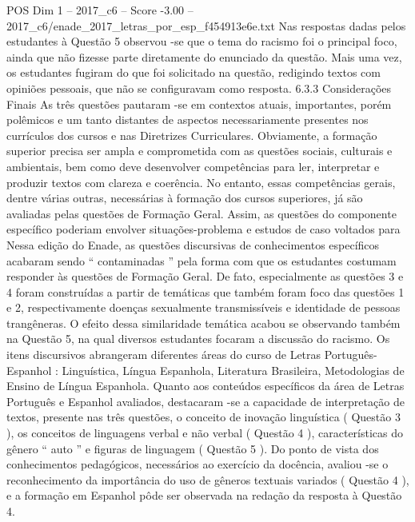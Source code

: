 \begin{textsample}{POS Dim 1 – 2017\_c6 – Score -3.00 – 2017\_c6/enade\_2017\_letras\_por\_esp\_f454913e6e.txt}
Nas respostas dadas pelos estudantes à Questão 5 observou -se que o tema do racismo foi o principal foco, ainda que não fizesse parte diretamente do enunciado da questão.
Mais uma vez, os estudantes fugiram do que foi solicitado na questão, redigindo textos com opiniões pessoais, que não se configuravam como resposta. 6.3.3 Considerações Finais As três questões pautaram -se em contextos atuais, importantes, porém polêmicos e um tanto distantes de aspectos necessariamente presentes nos currículos dos cursos e nas Diretrizes Curriculares.
Obviamente, a formação superior precisa ser ampla e comprometida com as questões sociais, culturais e ambientais, bem como deve desenvolver competências para ler, interpretar e produzir textos com clareza e coerência.
No entanto, essas competências gerais, dentre várias outras, necessárias à formação dos cursos superiores, já são avaliadas pelas questões de Formação Geral.
Assim, as questões do componente específico poderiam envolver situações-problema e estudos de caso voltados para Nessa edição do Enade, as questões discursivas de conhecimentos específicos acabaram sendo “ contaminadas ” pela forma com que os estudantes costumam responder às questões de Formação Geral.
De fato, especialmente as questões 3 e 4 foram construídas a partir de temáticas que também foram foco das questões 1 e 2, respectivamente doenças sexualmente transmissíveis e identidade de pessoas trangêneras.
O efeito dessa similaridade temática acabou se observando também na Questão 5, na qual diversos estudantes focaram a discussão do racismo.
Os itens discursivos abrangeram diferentes áreas do curso de Letras Português-Espanhol : Linguística, Língua Espanhola, Literatura Brasileira, Metodologias de Ensino de Língua Espanhola.
Quanto aos conteúdos específicos da área de Letras Português e Espanhol avaliados, destacaram -se a capacidade de interpretação de textos, presente nas três questões, o conceito de inovação linguística ( Questão 3 ), os conceitos de linguagens verbal e não verbal ( Questão 4 ), características do gênero “ auto ” e figuras de linguagem ( Questão 5 ).
Do ponto de vista dos conhecimentos pedagógicos, necessários ao exercício da docência, avaliou -se o reconhecimento da importância do uso de gêneros textuais variados ( Questão 4 ), e a formação em Espanhol pôde ser observada na redação da resposta à Questão 4.

\end{textsample}
